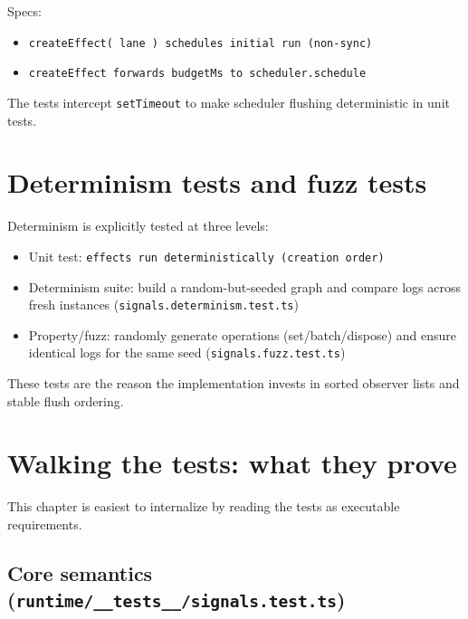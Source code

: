 Specs:

\begin{itemize}
  \item \texttt{createEffect({ lane }) schedules initial run (non-sync)}
  \item \texttt{createEffect forwards budgetMs to scheduler.schedule}
\end{itemize}

The tests intercept \texttt{setTimeout} to make scheduler flushing deterministic in unit tests.

\section{Determinism tests and fuzz tests}

Determinism is explicitly tested at three levels:

\begin{itemize}
  \item Unit test: \texttt{effects run deterministically (creation order)}
  \item Determinism suite: build a random-but-seeded graph and compare logs across fresh instances (\texttt{signals.determinism.test.ts})
  \item Property/fuzz: randomly generate operations (set/batch/dispose) and ensure identical logs for the same seed (\texttt{signals.fuzz.test.ts})
\end{itemize}

These tests are the reason the implementation invests in sorted observer lists and stable flush ordering.

\section{Walking the tests: what they prove}

This chapter is easiest to internalize by reading the tests as executable requirements.

\subsection{Core semantics (\texttt{runtime/\_\_tests\_\_/signals.test.ts})}

